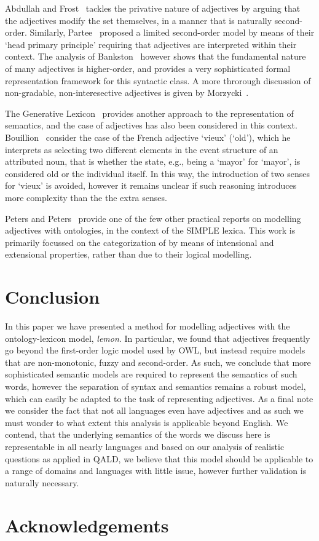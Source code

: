 \documentclass[11pt]{article}
\begin{document}
Abdullah and Frost~ tackles the privative nature of adjectives by arguing that the adjectives modify the set themselves, in a manner that is naturally second-order. Similarly, Partee~ proposed a limited second-order model by means of their `head primary principle' requiring that adjectives are interpreted within their context. The analysis of Bankston~ however shows that the fundamental nature of many adjectives is higher-order, and provides a very sophisticated formal representation framework for this syntactic class.
A more throrough discussion of non-gradable, non-interesective adjectives is given by Morzycki~.

The Generative Lexicon~\cite{pustejovsky1991generative} provides another approach to the representation of semantics, and the case of adjectives has also been considered in this context. Bouillion~ consider the case of the French adjective `vieux' (`old'), which he interprets as selecting two different
elements in the event structure of an attributed noun, that is whether the
state, e.g., being a `mayor' for `mayor', is considered old or the individual
itself. In this way, the introduction of two senses for `vieux' is avoided, 
however it remains unclear if such reasoning introduces more complexity than
the the extra senses.

Peters and Peters~ provide one of the few other practical reports on modelling adjectives with ontologies, in the context of the SIMPLE lexica. This work is primarily focussed on the categorization of by means of intensional and extensional properties, rather than due to their logical modelling. 

\section{Conclusion}

In this paper we have presented a method for modelling adjectives with the
ontology-lexicon model, \emph{lemon}. In particular, we found that adjectives
frequently go beyond the first-order logic model used by OWL, but instead 
require models that are non-monotonic, fuzzy and second-order. As such, we 
conclude that more sophisticated semantic models are required to represent the semantics
of such words, however the separation of syntax and semantics remains a robust
model, which can easily be adapted to the task of representing adjectives. As 
a final note we consider the fact that not all languages even have adjectives
\cite{?} and as such we must wonder to what extent this analysis is applicable
beyond English. We contend, that the underlying semantics of the words we discuss here
is representable in all nearly languages and based on our analysis of realistic
questions as applied in QALD, we believe that this model should be applicable
to a range of domains and languages with little issue, however further 
validation is naturally necessary.

\section*{Acknowledgements}



\end{document}
